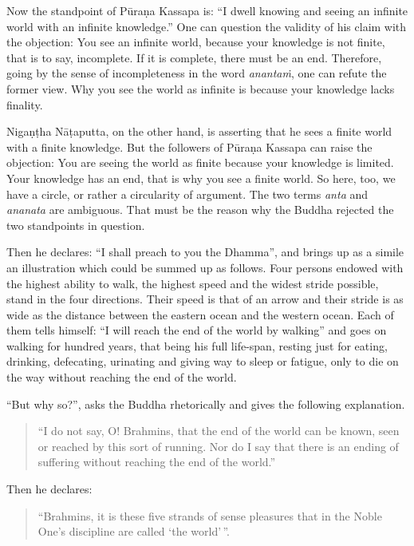 Now the standpoint of Pūraṇa Kassapa is: ``I dwell knowing and seeing an infinite world with an infinite knowledge.'' One can question the validity of his claim with the objection: You see an infinite world, because your knowledge is not finite, that is to say, incomplete. If it is complete, there must be an end. Therefore, going by the sense of incompleteness in the word \emph{anantaṁ}, one can refute the former view. Why you see the world as infinite is because your knowledge lacks finality.

Nigaṇṭha Nāṭaputta, on the other hand, is asserting that he sees a finite world with a finite knowledge. But the followers of Pūraṇa Kassapa can raise the objection: You are seeing the world as finite because your knowledge is limited. Your knowledge has an end, that is why you see a finite world. So here, too, we have a circle, or rather a circularity of argument. The two terms \emph{anta} and \emph{ananata} are ambiguous. That must be the reason why the Buddha rejected the two standpoints in question.

Then he declares: ``I shall preach to you the Dhamma'', and brings up as a simile an illustration which could be summed up as follows. Four persons endowed with the highest ability to walk, the highest speed and the widest stride possible, stand in the four directions. Their speed is that of an arrow and their stride is as wide as the distance between the eastern ocean and the western ocean. Each of them tells himself: ``I will reach the end of the world by walking'' and goes on walking for hundred years, that being his full life-span, resting just for eating, drinking, defecating, urinating and giving way to sleep or fatigue, only to die on the way without reaching the end of the world.

``But why so?'', asks the Buddha rhetorically and gives the following explanation.

\begin{quote}
``I do not say, O! Brahmins, that the end of the world can be known, seen or reached by this sort of running. Nor do I say that there is an ending of suffering without reaching the end of the world.''
\end{quote}

Then he declares:

\begin{quote}
``Brahmins, it is these five strands of sense pleasures that in the Noble One's discipline are called `the world'\,''.
\end{quote}

